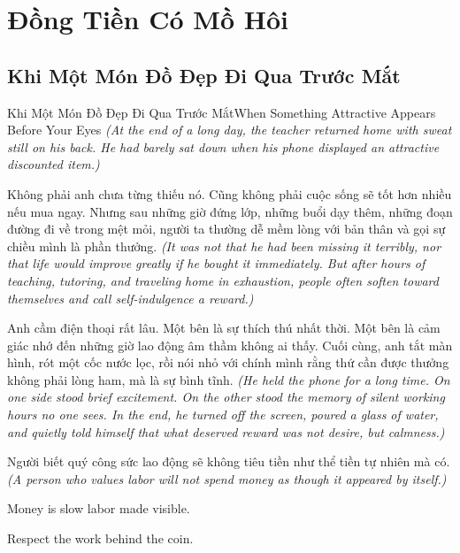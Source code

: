 \chapter{Đồng Tiền Có Mồ Hôi}

\section{Khi Một Món Đồ Đẹp Đi Qua Trước Mắt}
\begin{truyen}{Khi Một Món Đồ Đẹp Đi Qua Trước Mắt}{When Something Attractive Appears Before Your Eyes}
\textit{(At the end of a long day, the teacher returned home with sweat still on his back. He had barely sat down when his phone displayed an attractive discounted item.)}

Không phải anh chưa từng thiếu nó. Cũng không phải cuộc sống sẽ tốt hơn nhiều nếu mua ngay. Nhưng sau những giờ đứng lớp, những buổi dạy thêm, những đoạn đường đi về trong mệt mỏi, người ta thường dễ mềm lòng với bản thân và gọi sự chiều mình là phần thưởng.
\textit{(It was not that he had been missing it terribly, nor that life would improve greatly if he bought it immediately. But after hours of teaching, tutoring, and traveling home in exhaustion, people often soften toward themselves and call self-indulgence a reward.)}

Anh cầm điện thoại rất lâu. Một bên là sự thích thú nhất thời. Một bên là cảm giác nhớ đến những giờ lao động âm thầm không ai thấy. Cuối cùng, anh tắt màn hình, rót một cốc nước lọc, rồi nói nhỏ với chính mình rằng thứ cần được thưởng không phải lòng ham, mà là sự bình tĩnh.
\textit{(He held the phone for a long time. On one side stood brief excitement. On the other stood the memory of silent working hours no one sees. In the end, he turned off the screen, poured a glass of water, and quietly told himself that what deserved reward was not desire, but calmness.)}
\end{truyen}

\begin{baihoc}
Người biết quý công sức lao động sẽ không tiêu tiền như thể tiền tự nhiên mà có.
\textit{(A person who values labor will not spend money as though it appeared by itself.)}
\end{baihoc}

\begin{ghinhoanh}
Money is slow labor made visible.

Respect the work behind the coin.
\end{ghinhoanh}

